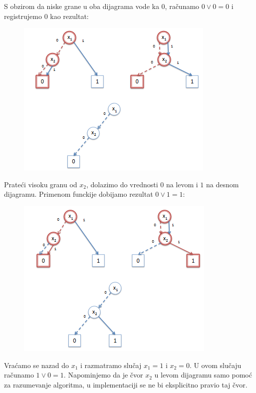 \begin{exmp}
    S obzirom da niske grane u oba dijagrama vode ka 0, ra\v{c}unamo $0 \vee 0 = 0$ i registrujemo $0$ kao rezultat:

    \begin{figure}[H]
        \centering
        \includegraphics{slike/ROBDD_primer_4.PNG}
    \end{figure}

    Prate\'c{}i visoku granu od $x_{2}$, dolazimo do vrednosti $0$ na levom i $1$ na desnom dijagramu. Primenom funckije dobijamo rezultat $0 \vee 1 = 1$:

    \begin{figure}[H]
        \centering
        \includegraphics{slike/ROBDD_primer_5.PNG}
    \end{figure}

    Vra\'c{}amo se nazad do $x_{1}$ i razmatramo slu\v{c}aj $x_{1} = 1$ i $x_{2} = 0$. U ovom slu\v{c}aju ra\v{c}unamo $1 \vee 0 = 1$. Napominjemo da je \v{c}vor $x_{2}$ u levom dijagramu samo pomo\'c{} za razumevanje algoritma, u implementaciji se ne bi eksplicitno pravio taj \v{c}vor.


\end{exmp}
